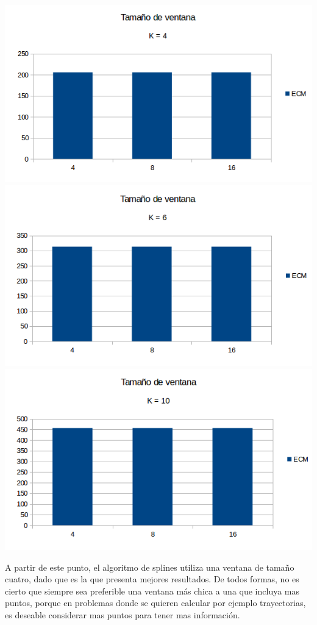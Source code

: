 \begin{center}
\includegraphics[scale=0.50]{imagenes/VK4.png}
\includegraphics[scale=0.50]{imagenes/VK6.png}
\includegraphics[scale=0.50]{imagenes/VK10.png}
\end{center}

A partir de este punto, el algoritmo de splines utiliza una ventana de tamaño cuatro, dado que es la que presenta mejores resultados.
De todos formas, no es cierto que siempre sea preferible una ventana más chica a una que incluya mas puntos, porque en problemas donde se quieren calcular por ejemplo trayectorias, es deseable considerar mas puntos para tener mas información.


